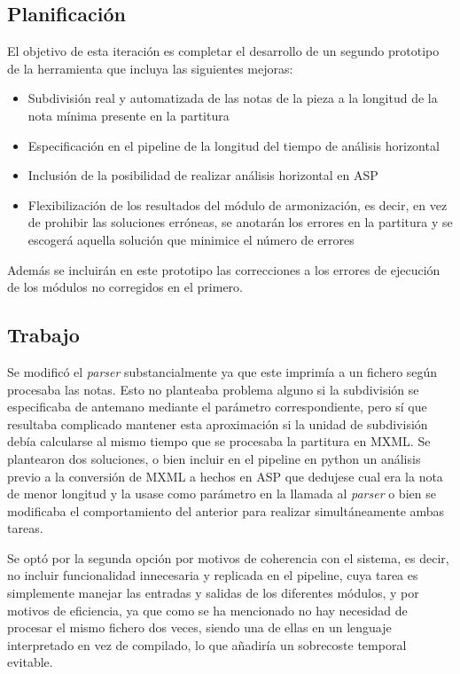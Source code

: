 \subsection{Planificación}
El objetivo de esta iteración es completar el desarrollo de un segundo prototipo de la herramienta que incluya las siguientes mejoras:
\begin{itemize}
	\item Subdivisión real y automatizada de las notas de la pieza a la longitud de la nota mínima presente en la partitura
	\item Especificación en el pipeline de la longitud del tiempo de análisis horizontal
	\item Inclusión de la posibilidad de realizar análisis horizontal en ASP
	\item Flexibilización de los resultados del módulo de armonización, es decir, en vez de prohibir las soluciones erróneas, se anotarán los errores en la partitura y se escogerá aquella solución que minimice el número de errores
\end{itemize}
Además se incluirán en este prototipo las correcciones a los errores de ejecución de los módulos no corregidos en el primero.

\subsection{Trabajo}
Se modificó el \textit{parser} substancialmente ya que este imprimía a un fichero según procesaba las notas. Esto no planteaba problema alguno si la subdivisión se especificaba de antemano mediante el parámetro correspondiente, pero sí que resultaba complicado mantener esta aproximación si la unidad de subdivisión debía calcularse al mismo tiempo que se procesaba la partitura en MXML. Se plantearon dos soluciones, o bien incluir en el pipeline en python un análisis previo a la conversión de MXML a hechos en ASP que dedujese cual era la nota de menor longitud y la usase como parámetro en la llamada al \textit{parser} o bien se modificaba el comportamiento del anterior para realizar simultáneamente ambas tareas. 

Se optó por la segunda opción por motivos de coherencia con el sistema, es decir, no incluir funcionalidad innecesaria y replicada en el pipeline, cuya tarea es simplemente manejar las entradas y salidas de los diferentes módulos, y por motivos de eficiencia, ya que como se ha mencionado no hay necesidad de procesar el mismo fichero dos veces, siendo una de ellas en un lenguaje interpretado en vez de compilado, lo que añadiría un sobrecoste temporal evitable.

